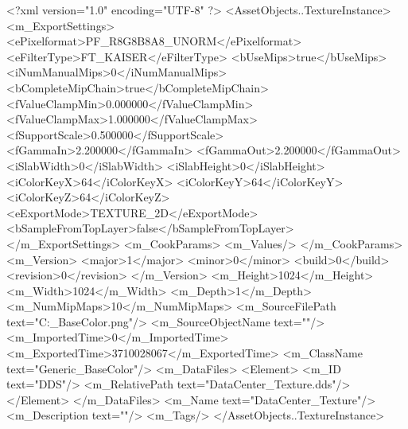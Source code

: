 <?xml version="1.0" encoding="UTF-8" ?>
<AssetObjects..TextureInstance>
	<m_ExportSettings>
		<ePixelformat>PF_R8G8B8A8_UNORM</ePixelformat>
		<eFilterType>FT_KAISER</eFilterType>
		<bUseMips>true</bUseMips>
		<iNumManualMips>0</iNumManualMips>
		<bCompleteMipChain>true</bCompleteMipChain>
		<fValueClampMin>0.000000</fValueClampMin>
		<fValueClampMax>1.000000</fValueClampMax>
		<fSupportScale>0.500000</fSupportScale>
		<fGammaIn>2.200000</fGammaIn>
		<fGammaOut>2.200000</fGammaOut>
		<iSlabWidth>0</iSlabWidth>
		<iSlabHeight>0</iSlabHeight>
		<iColorKeyX>64</iColorKeyX>
		<iColorKeyY>64</iColorKeyY>
		<iColorKeyZ>64</iColorKeyZ>
		<eExportMode>TEXTURE_2D</eExportMode>
		<bSampleFromTopLayer>false</bSampleFromTopLayer>
	</m_ExportSettings>
	<m_CookParams>
		<m_Values/>
	</m_CookParams>
	<m_Version>
		<major>1</major>
		<minor>0</minor>
		<build>0</build>
		<revision>0</revision>
	</m_Version>
	<m_Height>1024</m_Height>
	<m_Width>1024</m_Width>
	<m_Depth>1</m_Depth>
	<m_NumMipMaps>10</m_NumMipMaps>
	<m_SourceFilePath text="C:\Users\prajw\Downloads\DataCenter_BaseColor.png"/>
	<m_SourceObjectName text=""/>
	<m_ImportedTime>0</m_ImportedTime>
	<m_ExportedTime>3710028067</m_ExportedTime>
	<m_ClassName text="Generic_BaseColor"/>
	<m_DataFiles>
		<Element>
			<m_ID text="DDS"/>
			<m_RelativePath text="DataCenter_Texture.dds"/>
		</Element>
	</m_DataFiles>
	<m_Name text="DataCenter_Texture"/>
	<m_Description text=""/>
	<m_Tags/>
</AssetObjects..TextureInstance>

